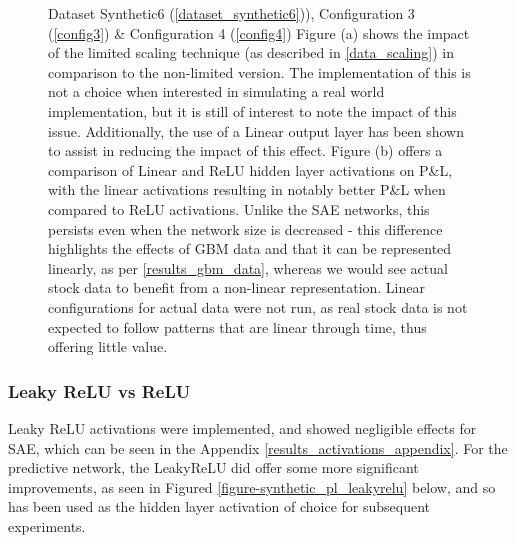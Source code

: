 \documentclass[a4paper,11pt,oneside]{article}
\theoremstyle{plain}
\theoremstyle{definition}
\begin{document}
\begin{figure}[H]
\begin{subfigure}{.5\textwidth}
			\label{figure-synth_pl_hidden}
		\end{subfigure}
		\caption[P\&L by Scaling and Activations (Synthetic Data)]{Dataset Synthetic6  (\ref{dataset_synthetic6})), Configuration 3 (\ref{config3}) \& Configuration 4 (\ref{config4})
			\newline Figure (a) shows the impact of the limited scaling technique (as described in \ref{data_scaling}) in comparison to the non-limited version. The implementation of this is not a choice when interested in simulating a real world implementation, but it is still of interest to note the impact of this issue. Additionally, the use of a Linear output layer has been shown to assist in reducing the impact of this effect.
			\newline Figure (b) offers a comparison of Linear and ReLU hidden layer activations on P\&L, with the linear activations resulting in notably better P\&L when compared to ReLU activations. Unlike the SAE networks, this persists even when the network size is decreased - this difference highlights the effects of GBM data and that it can be represented linearly, as per \ref{results_gbm_data}, whereas we would see actual stock data to benefit from a non-linear representation. Linear configurations for actual data were not run, as real stock data is not expected to follow patterns that are linear through time, thus offering little value.}
		\label{figure-pl_activations_scaling}
	\end{figure}
	
	
	
	\subsubsection{Leaky ReLU vs ReLU}
	
	Leaky ReLU activations were implemented, and showed negligible effects for SAE, which can be seen in the Appendix \ref{results_activations_appendix}. For the predictive network, the LeakyReLU did offer some more significant improvements, as seen in Figured \ref{figure-synthetic_pl_leakyrelu} below, and so has been used as the hidden layer activation of choice for subsequent experiments.
	
\end{document}
